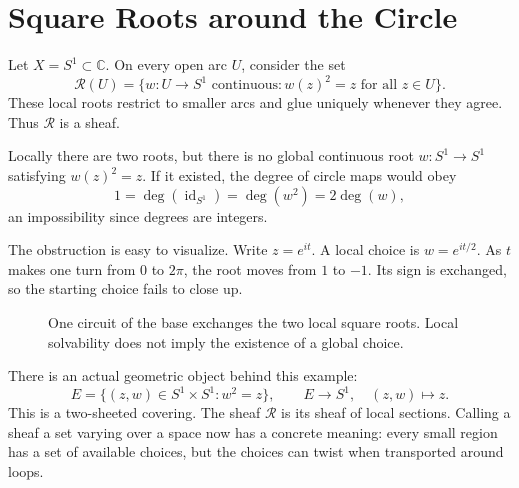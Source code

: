 \section{Square Roots around the Circle}

Let \(X=S^1\subset\mathbb C\). On every open arc \(U\), consider the set
\[
 \mathcal R(U)=
 \{w:U\to S^1\text{ continuous}:
            w(z)^2=z\text{ for all }z\in U\}.
\]
These local roots restrict to smaller arcs and glue uniquely whenever they agree. Thus \(\mathcal R\) is a sheaf.

Locally there are two roots, but there is no global continuous root \(w:S^1\to S^1\) satisfying \(w(z)^2=z\). If it existed, the degree of circle maps would obey
\[
 1=\deg(\operatorname{id}_{S^1})
  =\deg(w^2)=2\deg(w),
\]
an impossibility since degrees are integers.

The obstruction is easy to visualize. Write \(z=e^{it}\). A local choice is \(w=e^{it/2}\). As \(t\) makes one turn from \(0\) to \(2\pi\), the root moves from \(1\) to \(-1\). Its sign is exchanged, so the starting choice fails to close up.

\begin{figure}[H]
\centering
{}
\caption{One circuit of the base exchanges the two local square roots. Local solvability does not imply the existence of a global choice.}
\end{figure}

There is an actual geometric object behind this example:
\[
 E=\{(z,w)\in S^1\times S^1:w^2=z\},
 \qquad E\longrightarrow S^1,\quad(z,w)\longmapsto z.
\]
This is a two-sheeted covering. The sheaf \(\mathcal R\) is its sheaf of local sections. Calling a sheaf a set varying over a space now has a concrete meaning: every small region has a set of available choices, but the choices can twist when transported around loops.

